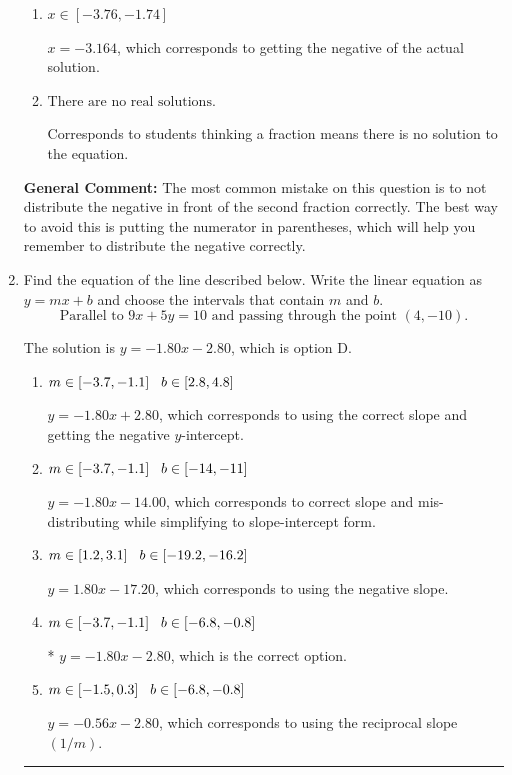 \documentclass{extbook}[14pt]
\newcommand{\litem}[1]{\item #1

\rule{\textwidth}{0.4pt}}
\begin{document}
\begin{enumerate}
{\begin{enumerate}[label=\Alph*.]
* $x = -0.030$, which is the correct option.
\item \( x \in [-3.76, -1.74] \)

$x = -3.164$, which corresponds to getting the negative of the actual solution.
\item \( \text{There are no real solutions.} \)

Corresponds to students thinking a fraction means there is no solution to the equation.
\end{enumerate}

\textbf{General Comment:} The most common mistake on this question is to not distribute the negative in front of the second fraction correctly. The best way to avoid this is putting the numerator in parentheses, which will help you remember to distribute the negative correctly.
}
\litem{
Find the equation of the line described below. Write the linear equation as $ y=mx+b $ and choose the intervals that contain $m$ and $b$.
\[ \text{Parallel to } 9 x + 5 y = 10 \text{ and passing through the point } (4, -10). \]

The solution is \( y = -1.80x - 2.80 \), which is option D.\begin{enumerate}[label=\Alph*.]
\item \( m \in [-3.7, -1.1] \hspace*{3mm} b \in [2.8, 4.8] \)

 $y = -1.80x + 2.80$, which corresponds to using the correct slope and getting the negative $y$-intercept.
\item \( m \in [-3.7, -1.1] \hspace*{3mm} b \in [-14, -11] \)

 $y = -1.80x - 14.00$, which corresponds to correct slope and mis-distributing while simplifying to slope-intercept form.
\item \( m \in [1.2, 3.1] \hspace*{3mm} b \in [-19.2, -16.2] \)

 $y = 1.80x - 17.20$, which corresponds to using the negative slope.
\item \( m \in [-3.7, -1.1] \hspace*{3mm} b \in [-6.8, -0.8] \)

* $y = -1.80x - 2.80$, which is the correct option.
\item \( m \in [-1.5, 0.3] \hspace*{3mm} b \in [-6.8, -0.8] \)

 $y = -0.56x - 2.80$, which corresponds to using the reciprocal slope $(1/m)$.
\end{enumerate}

}
\end{enumerate}
\end{document}
